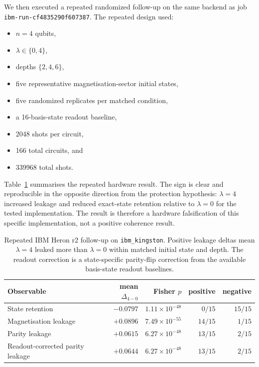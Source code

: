 \documentclass[preprint,aps,physrev,superscriptaddress,floatfix,longbibliography]{revtex4-2}
\begin{document}
We then executed a repeated randomized follow-up on the same backend as job
\texttt{ibm-run-cf4835290f607387}. The repeated design used:
%
\begin{itemize}
  \item $n=4$ qubits,
  \item $\lambda\in\{0,4\}$,
  \item depths $\{2,4,6\}$,
  \item five representative magnetisation-sector initial states,
  \item five randomized replicates per matched condition,
  \item a 16-basis-state readout baseline,
  \item 2048 shots per circuit,
  \item 166 total circuits, and
  \item 339968 total shots.
\end{itemize}

Table~\ref{tab:ibm} summarises the repeated hardware result. The sign is clear
and reproducible in the opposite direction from the protection hypothesis:
$\lambda=4$ increased leakage and reduced exact-state retention relative to
$\lambda=0$ for the tested implementation. The result is therefore a
hardware falsification of this specific implementation, not a positive
coherence result.

\begin{table}[tb]
\centering
\small
\begin{tabular}{lrrrr}
\toprule
Observable & mean $\Delta_{4-0}$ & Fisher $p$ & positive & negative \\
\midrule
State retention & $-0.0797$ & $1.11\times10^{-48}$ & $0/15$ & $15/15$ \\
Magnetisation leakage & $+0.0896$ & $7.49\times10^{-55}$ & $14/15$ & $1/15$ \\
Parity leakage & $+0.0615$ & $6.27\times10^{-48}$ & $13/15$ & $2/15$ \\
Readout-corrected parity leakage & $+0.0644$ & $6.27\times10^{-48}$ & $13/15$ & $2/15$ \\
\bottomrule
\end{tabular}
\caption{Repeated IBM Heron r2 follow-up on \texttt{ibm\_kingston}. Positive
leakage deltas mean $\lambda=4$ leaked more than $\lambda=0$ within matched
initial state and depth. The readout correction is a state-specific parity-flip
correction from the available basis-state readout baselines.}
\label{tab:ibm}
\end{table}
\end{document}
